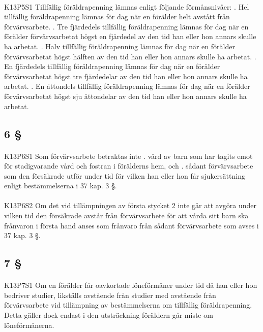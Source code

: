 \documentclass[a4paper,notitlepage,openany,10pt]{book}
\begin{document}
\paragraph*{}
{\tiny K13P5S1}
Tillfällig föräldrapenning lämnas enligt följande förmånsnivåer:
. Hel tillfällig föräldrapenning lämnas för dag när en förälder helt avstått från förvärvsarbete.
. Tre fjärdedels tillfällig föräldrapenning lämnas för dag när en förälder förvärvsarbetat högst en fjärdedel av den tid han eller hon annars skulle ha arbetat.
. Halv tillfällig föräldrapenning lämnas för dag när en förälder förvärvsarbetat högst hälften av den tid han eller hon annars skulle ha arbetat.
. En fjärdedels tillfällig föräldrapenning lämnas för dag när en förälder förvärvsarbetat högst tre fjärdedelar av den tid han eller hon annars skulle ha arbetat.
. En åttondels tillfällig föräldrapenning lämnas för dag när en förälder förvärvsarbetat högst sju åttondelar av den tid han eller hon annars skulle ha arbetat.
\subsection*{6 §}
\paragraph*{}
{\tiny K13P6S1}
Som förvärvsarbete betraktas inte
. vård av barn som har tagits emot för stadigvarande vård och fostran i förälderns hem, och
. sådant förvärvsarbete som den försäkrade utför under tid för vilken han eller hon får sjukersättning enligt bestämmelserna i 37 kap. 3 §.
\paragraph*{}
{\tiny K13P6S2}
Om det vid tillämpningen av första stycket 2 inte går att avgöra under vilken tid den försäkrade avstår från förvärvsarbete för att vårda sitt barn ska frånvaron i första hand anses som frånvaro från sådant förvärvsarbete som avses i 37 kap. 3 §.
\subsection*{7 §}
\paragraph*{}
{\tiny K13P7S1}
Om en förälder får oavkortade löneförmåner under tid då han eller hon bedriver studier, likställs avstående från studier med avstående från förvärvsarbete vid tillämpning av bestämmelserna om tillfällig föräldrapenning. Detta gäller dock endast i den utsträckning föräldern går miste om löneförmånerna.
\end{document}
